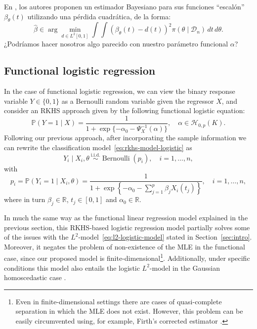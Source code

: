 \documentclass[ba]{imsart}
\numberwithin{equation}{section}
\theoremstyle{plain}
\newcommand{\R}{\mathbb{R}}
\newenvironment{comment}
{
\noindent \em \color{red}
}
{
\color{black}
}
\begin{document}
\begin{comment}
  En \citet[Sec.~2.5]{grollemund2019bayesian}, los autores proponen un estimador Bayesiano para sus funciones ``escalón'' \(\beta_\theta(t)\) utilizando una pérdida cuadrática, de la forma:
  \[
    \hat \beta \in \arg\min_{d\in L^2[0, 1]} \int\int (\beta_\theta(t) - d(t))^2 \pi(\theta\mid \mathcal D_n)\, dt\, d\theta.
  \]
  ¿Podríamos hacer nosotros algo parecido con nuestro parámetro funcional \(\alpha\)?
\end{comment}

\subsection{Functional logistic regression}\label{sec:rkhs-logistic-model}

In the case of functional logistic regression, we can view the binary response variable \(Y\in\{0, 1\}\) as a Bernoulli random variable given the regressor \(X\), and consider an RKHS approach given by the following functional logistic equation:
\begin{equation}\label{eq:rkhs-model-logistic}
  \mathbb P(Y=1 \mid X) = \frac{1}{1 + \exp\{-\alpha_0 - \Psi^{-1}_X(\alpha)\}}, \quad \alpha \in \mathcal H_{0,p}(K).
\end{equation}
Following our previous approach, after incorporating the sample information we can rewrite the classification model~\eqref{eq:rkhs-model-logistic} as
\begin{equation}\label{eq:rkhs-model-logistic-2}
Y_i \mid X_i,\theta \ \stackrel{\text{i.i.d.}}{\sim} \operatorname{Bernoulli}(p_i), \quad i=1,\dots, n,
\end{equation}
with
\begin{equation}\label{eq:rkhs-model-logistic-2-parameter}
  p_i = \mathbb P(Y_i=1 \mid X_i,\theta) = \frac{1}{\displaystyle 1 + \exp\left\{-\alpha_0 - \sum_{j=1}^p \beta_j X_i(t_j)\right\}}, \quad i=1,\dots, n,
\end{equation}
where in turn \(\beta_j\in\R\), \(t_j\in[0, 1]\) and \(\alpha_0\in\R\).

In much the same way as the functional linear regression model explained in the previous section, this RKHS-based logistic regression model partially solves some of the issues with the \(L^2\)-model~\eqref{eq:l2-logistic-model} stated in Section~\ref{sec:intro}. Moreover, it negates the problem of non-existence of the MLE in the functional case, since our proposed model is finite-dimensional\footnote{Even in finite-dimensional settings there are cases of quasi-complete separation in which the MLE does not exist. However, this problem can be easily circumvented using, for example, Firth's corrected estimator \citep{firth1993bias}.}. Additionally, under specific conditions this model also entails the logistic \(L^2\)-model in the Gaussian homoscedastic case \citep[see][Th.~1]{buenolarraz2021functional}.
\end{document}
